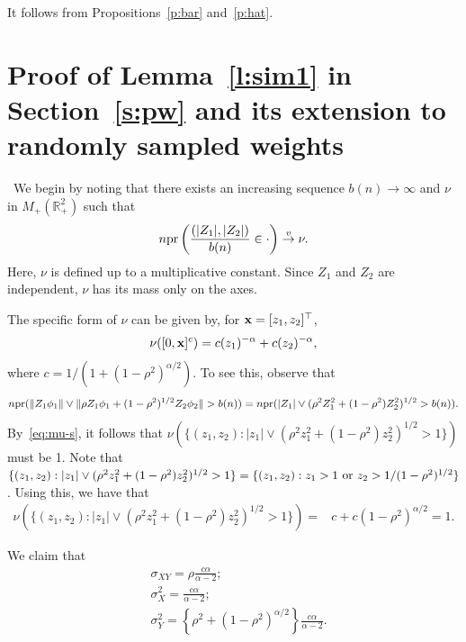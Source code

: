 \documentclass[lineno]{biometrika}
\newcommand \ag{\alpha}
\newcommand \sg{\sigma}
\newcommand\bx{{\bf x}}
\newcommand\mbR{{\mathbb R}}
\newcommand\lp{\left (}
\newcommand\rp{\right )}
\newcommand\lbr{\left \{}
\newcommand\rbr{\right \}}
\def\convv{\stackrel{\mbox{$\scriptstyle v$}}{\rightarrow}}
\begin{document}
 It follows from Propositions~\ref{p:bar} and~\ref{p:hat}.

\clearpage

\appendixthree
\section{Proof of Lemma~\ref{l:sim1} in Section~\ref{s:pw} and its extension to randomly sampled weights} \label{s:pr_sim}

\allowdisplaybreaks
{} \
We begin by noting that there exists an increasing sequence $b(n) \to \infty$ and $\nu$ in $M_+(\mbR_+^2)$ such that
\begin{equation} \label{eq:dRV2}
n{\rm pr} \lp \frac{(|Z_1|, |Z_2|)}{b(n)} \in \cdot \rp \convv \nu.
\end{equation}
Here, $\nu$ is defined up to a multiplicative constant. Since $Z_1$ and $Z_2$ are independent, $\nu$ has its mass only on the axes.

The specific form of $\nu$ can be given by, for $\bx = [z_1, z_2]^{\top}$,
\begin{equation} \label{eq:cnu}
\nu([0, \bx]^c) = c(z_1)^{-\ag} +c(z_2)^{-\ag},
\end{equation}
where $c = 1/(1+ (1-\rho^2)^{\ag/2})$. To see this, observe that
\begin{align*}
n{\rm pr}(\| Z_1 \phi_1 \|  \vee  \| \rho Z_1 \phi_1+(1-\rho^2)^{1/2} Z_2 \phi_2 \| > b(n)) = n{\rm pr}(|Z_1|  \vee  (\rho^2 Z_1^2 + (1-\rho^2) Z_2^2)^{1/2} > b(n)).
\end{align*}
By~\eqref{eq:mu-s}, it follows that $\nu(\{(z_1,z_2): |z_1| \vee ( \rho^2 z_1^2 + (1-\rho^2) z_2^2 )^{1/2} >1 \})$ must be 1. Note that $\{(z_1,z_2): |z_1| \vee ( \rho^2 z_1^2 + (1-\rho^2) z_2^2 )^{1/2} >1 \} = \{(z_1,z_2): z_1>1 \ {\rm or}\ z_2>1/(1-\rho^2)^{1/2} \}$. Using this, we have that
\begin{align*}
\nu(\{(z_1,z_2): |z_1| \vee ( \rho^2 z_1^2 + (1-\rho^2) z_2^2 )^{1/2} >1 \})
=&c + c (1-\rho^2)^{\ag/2} = 1.
\end{align*}


We claim that
\begin{align} \label{eq:sxy}
    & \sg_{XY}=\rho  \frac{c\ag}{\ag-2};\\ \label{eq:sx}
    & \sg_{X}^2 =\frac{c\ag}{\ag-2};\\ \label{eq:sy}
    & \sg_{Y}^2 =\lbr \rho^2 + (1-\rho^2)^{\ag/2} \rbr \frac{c\ag}{\ag-2}.
\end{align}
\end{document}
